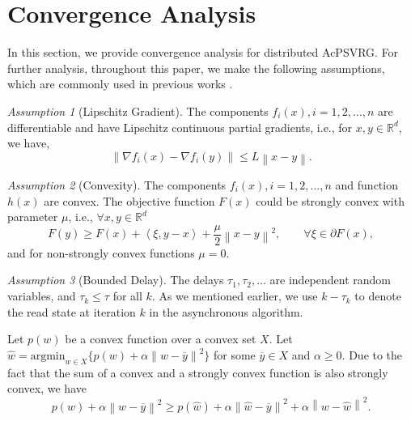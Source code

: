 \documentclass{article}
\newcommand*{\R}{\mathbb{R}}
\newcommand{\norm}[1]{\left\lVert#1\right\rVert}
\newcommand{\Iprod}[2]{\left\langle #1,#2\right\rangle}
\theoremstyle{definition}
\theoremstyle{remark}
\newtheorem{Assumption}{Assumption}
\begin{document}
\section{Convergence Analysis}
In this section, we provide convergence analysis for distributed AcPSVRG. For further analysis, throughout this paper, we make the following assumptions, which are commonly used in previous works \cite{Reddi2015, Meng2016}.

\begin{Assumption}[Lipschitz Gradient]\label{Assump1}
The components $f_i(x), i=1,2,\ldots,n$ are differentiable and have Lipschitz continuous partial gradients, i.e., for $x,y\in \R^d$, we have,
\begin{equation}
    \norm{\nabla f_i(x) - \nabla f_i(y)} \leq L \norm{x-y}.
\end{equation}
\end{Assumption}
\begin{Assumption}[Convexity]\label{Assump2}
The components $f_i(x), i=1,2,\ldots,n$ and function $h(x)$ are convex. The objective function $F(x)$ could be strongly convex with parameter $\mu$, i.e., 
$\forall x,y \in \R^d$
\begin{equation}\label{Convex:Eq1}
F(y)\geq F(x) + \Iprod{\xi}{y-x} + \frac{\mu}{2}\norm{x-y}^2,\qquad \forall \xi\in\partial F(x),
\end{equation}
and for non-strongly convex functions $\mu=0$. 
\end{Assumption}

\begin{Assumption}[Bounded Delay]\label{Assump3}
The delays $\tau_1,\tau_2,\ldots$ are independent random variables, and $\tau_k\leq \tau$ for all $k$. As we mentioned earlier, we use $k-\tau_k$ to denote the read state at iteration $k$ in the asynchronous algorithm.
\end{Assumption}

Let $p(w)$ be a convex function over a convex set $X$. Let $\hat{w} = \text{argmin}_{w\in X}\{p(w)+\alpha\norm{w-\overline{y}}^2\}$ for some $\overline{y}\in X$ and $\alpha\geq 0$. Due to the fact that the sum of a convex and a strongly convex function is also strongly convex,  we have
\begin{equation}\label{threepoint-convex}
 p(w)+\alpha\norm{w-\overline{y}}^2 \geq p(\hat{w})+\alpha\norm{\hat{w}-\overline{y}}^2+\alpha\norm{w-\hat{w}}^2.
\end{equation}
\end{document}
